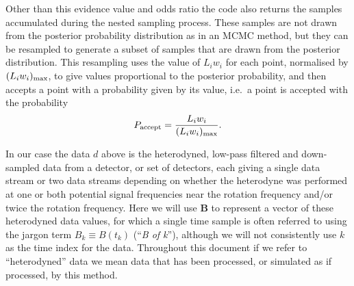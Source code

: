 Other than this evidence value and odds ratio the code also returns the samples accumulated during
the nested sampling process. These samples are not drawn from the posterior probability distribution as in
an MCMC method, but they can be resampled to generate a subset of samples that are drawn from the posterior
distribution. This resampling \citep[performed using the {\tt lalapps\_nest2pos} {\tt python} script within
{\tt lalapps}][]{lalsuite} uses the
value of $L_i w_i$ for each point, normalised by $(L_iw_i)_{\rm max}$, to give values proportional to the
posterior probability, and then accepts a point with a probability given by its value, i.e.\ a point is
accepted with the probability
\begin{equation}\label{eq:postaccept}
P_{\text{accept}} = \frac{L_i w_i}{(L_iw_i)_{\rm max}}.
\end{equation}

In our case the data $d$ above is the heterodyned, low-pass filtered and down-sampled data
from a detector, or set of detectors, each giving a single data stream or two data streams depending on
whether the heterodyne was performed at one or both potential signal frequencies near the rotation frequency
and/or twice the rotation frequency. Here we will use $\mathbf{B}$ to represent a vector of these heterodyned
data values, for which a single time sample is often referred to using the jargon term $B_k \equiv B(t_k)$ (``{\it B of k}''), although we will
not consistently use $k$ as the time index for the data. Throughout this document if we refer to ``heterodyned'' data we mean
data that has been processed, or simulated as if processed, by this method.
